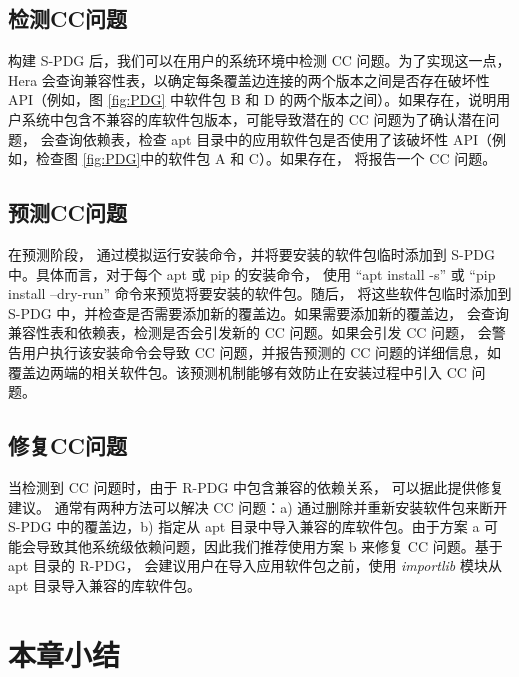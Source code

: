 \subsection{检测CC问题}\label{4.2.2}
构建 S-PDG 后，我们可以在用户的系统环境中检测 CC 问题。为了实现这一点，Hera 会查询兼容性表，以确定每条覆盖边连接的两个版本之间是否存在破坏性 API（例如，图 \ref{fig:PDG} 中软件包 B 和 D 的两个版本之间）。如果存在，说明用户系统中包含不兼容的库软件包版本，可能导致潜在的 CC 问题为了确认潜在问题，\tool{} 会查询依赖表，检查 apt 目录中的应用软件包是否使用了该破坏性 API（例如，检查图 \ref{fig:PDG}中的软件包 A 和 C）。如果存在，\tool{} 将报告一个 CC 问题。

\subsection{预测CC问题}\label{4.2.3}
在预测阶段，\tool{} 通过模拟运行安装命令，并将要安装的软件包临时添加到 S-PDG 中。具体而言，对于每个 apt 或 pip 的安装命令，\tool{} 使用 “apt install -s” 或 “pip install --dry-run” 命令来预览将要安装的软件包。随后，\tool{} 将这些软件包临时添加到 S-PDG 中，并检查是否需要添加新的覆盖边。如果需要添加新的覆盖边，\tool{} 会查询兼容性表和依赖表，检测是否会引发新的 CC 问题。如果会引发 CC 问题，\tool{} 会警告用户执行该安装命令会导致 CC 问题，并报告预测的 CC 问题的详细信息，如覆盖边两端的相关软件包。该预测机制能够有效防止在安装过程中引入 CC 问题。

\subsection{修复CC问题}\label{4.2.4}
当检测到 CC 问题时，由于 R-PDG 中包含兼容的依赖关系，\tool{} 可以据此提供修复建议。
通常有两种方法可以解决 CC 问题：a) 通过删除并重新安装软件包来断开 S-PDG 中的覆盖边，b) 指定从 apt 目录中导入兼容的库软件包。由于方案 a 可能会导致其他系统级依赖问题，因此我们推荐使用方案 b 来修复 CC 问题。基于 apt 目录的 R-PDG，\tool{} 会建议用户在导入应用软件包之前，使用 \textit{importlib} 模块从 apt 目录导入兼容的库软件包。

\section{本章小结}